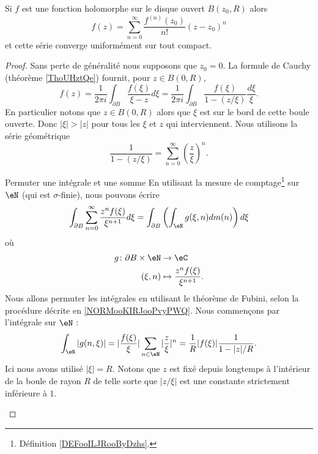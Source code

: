 \begin{theorem}     \label{THOooSULFooHTLRPE}
    Si \( f\) est une fonction holomorphe sur le disque ouvert \( B(z_0,R)\) alors
    \begin{equation}
        f(z)=\sum_{n=0}^{\infty}\frac{ f^{(n)}(z_0) }{ n! }(z-z_0)^n
    \end{equation}
    et cette série converge uniformément sur tout compact.
\end{theorem}

\begin{proof}
    Sans perte de généralité nous supposons que \( z_0=0\). La formule de Cauchy (théorème \ref{ThoUHztQe}) fournit, pour \( z\in B(0,R)\),
    \begin{equation}
        f(z)=\frac{1}{ 2\pi i }\int_{\partial B}\frac{ f(\xi) }{ \xi-z }d\xi=\frac{1}{ 2\pi i }\int_{\partial B}\frac{ f(\xi) }{ 1-(z/\xi) }\frac{ d\xi }{ \xi }.
    \end{equation}
    En particulier notons que \( z\in B(0,R)\) alors que \( \xi\) est sur le bord de cette boule ouverte. Donc \( | \xi |>| z |\) pour tous les \( \xi\) et \( z\) qui interviennent. Nous utilisons la série géométrique
    \begin{equation}
        \frac{1}{ 1-(z/\xi) }=\sum_{n=0}^{\infty}\left( \frac{ z }{ \xi } \right)^n.
    \end{equation}

    \begin{subproof}
        \item[Permuter une intégrale et une somme]
            En utilisant la mesure de comptage\footnote{Définition \ref{DEFooILJRooByDzhs}.} sur \( \eN\) (qui est \( \sigma\)-finie), nous pouvons écrire
            \begin{equation}        \label{EQooWOLOooFHSrsx}
                \int_{\partial B}\sum_{n=0}^{\infty}\frac{ z^nf(\xi) }{ \xi^{n+1} }d\xi= \int_{\partial B}\left( \int_{\eN}g(\xi,n)dm(n) \right)d\xi
            \end{equation}
            où \begin{equation}
                \begin{aligned}
                    g\colon \partial B\times \eN&\to \eC \\
                    (\xi,n)&\mapsto \frac{ z^nf(\xi) }{ \xi^{n+1} }. 
                \end{aligned}
            \end{equation}
            Nous allons permuter les intégrales en utilisant le théorème de Fubini, selon la procédure décrite en \ref{NORMooKIRJooPvyPWQ}. Nous commençons par l'intégrale sur \( \eN\) :
            \begin{equation}        \label{EQooLQLOooKiSAKH}
                \int_{\eN}| g(n,\xi) |=| \frac{ f(\xi) }{ \xi } |\sum_{n\in \eN}| \frac{ z }{ \xi } |^n=\frac{1}{ R }| f(\xi) |\frac{1}{ 1-| z |/R }.
            \end{equation}
            Ici nous avons utilisé \( | \xi |=R\). Notons que \( z\) est fixé depuis longtemps à l'intérieur de la boule de rayon \( R\) de telle sorte que \( | z/\xi |\) est une constante strictement inférieure à \( 1\).


\end{subproof}
\end{proof}

